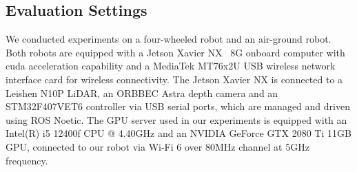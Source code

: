 \subsection{Evaluation Settings}


We conducted experiments on a four-wheeled robot and an air-ground robot.
Both robots are equipped with a Jetson Xavier NX~\cite{jetsonnx} 8G onboard computer with cuda acceleration capability and a MediaTek MT76x2U USB wireless network interface card for wireless connectivity.
The Jetson Xavier NX is connected to a Leishen N10P LiDAR, an ORBBEC Astra depth camera and an STM32F407VET6 controller via USB serial ports, which are managed and driven using ROS Noetic. 
The GPU server used in our experiments is equipped with an Intel(R) i5 12400f CPU @ 4.40GHz and an NVIDIA GeForce GTX 2080 Ti 11GB GPU, connected to our robot via Wi-Fi 6 over 80MHz channel at 5GHz frequency.



